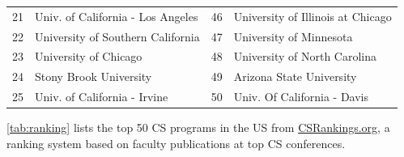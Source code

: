 \documentclass[oneside,11pt,dvipsnames]{book}
\newcommand{\red}[1]{{\color{red}{#1}}}
\begin{document}
\begin{table}
\begin{tabular}{rl|rl}
    21 & Univ. of California - Los Angeles &46& University of Illinois at Chicago  \\
    22 & University of Southern California &47& University of Minnesota \\
    23 & University of Chicago &48& University of North Carolina\red{$^*$} \\
    24 & Stony Brook University\red{$^*$} &49& Arizona State University\red{$^*$} \\
    25 &  Univ. of California - Irvine&50& Univ. Of California - Davis \\
    \bottomrule
  \end{tabular}
\end{table}
\autoref{tab:ranking} lists the top 50 CS programs in the US from \href{https://www.csrankings.org}{CSRankings.org}, a ranking system  based on faculty publications at top CS conferences.






\end{document}
